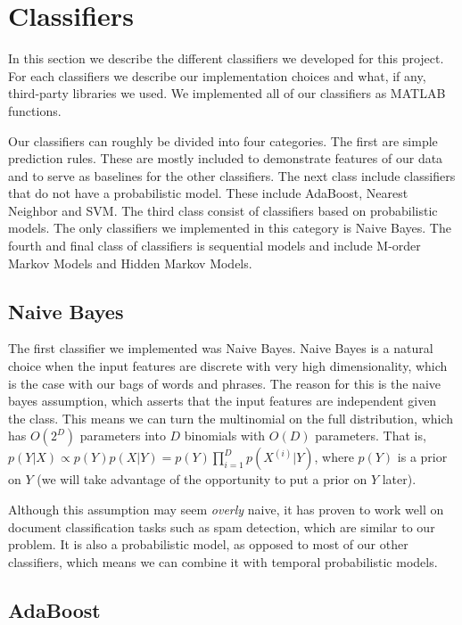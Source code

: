 \documentclass[10pt, twocolumn]{article}
\begin{document}
\section{Classifiers}
\label{sec:techniques}

In this section we describe the different classifiers we developed for this project.
For each classifiers we describe our implementation choices and what, if any, third-party libraries we used.
We implemented all of our classifiers as MATLAB functions.

Our classifiers can roughly be divided into four categories. The first are simple prediction rules. These are mostly included to demonstrate features of our data and to serve as baselines for the other classifiers. The next class include classifiers that do not have a probabilistic model. These include AdaBoost, Nearest Neighbor and SVM. The third class consist of classifiers based on probabilistic models. The only classifiers we implemented in this category is Naive Bayes. The fourth and final class of classifiers is sequential models and include M-order Markov Models and Hidden Markov Models.

\subsection{Naive Bayes}
\label{sec:naive-bayes}

The first classifier we implemented was Naive Bayes.
Naive Bayes is a natural choice when the input features are discrete with very high dimensionality, which is the case with our bags of words and phrases.
The reason for this is the naive bayes assumption, which asserts that the input features are independent given the class.
This means we can turn the multinomial on the full distribution, which has $O(2^D)$ parameters into $D$ binomials with $O(D)$ parameters.
That is, $p(Y|X) \propto p(Y)p(X|Y) = p(Y)\prod_{i=1}^{D}{p(X^{(i)}|Y)}$, where $p(Y)$ is a prior on $Y$ (we will take advantage of the opportunity to put a prior on $Y$ later).

Although this assumption may seem \emph{overly} naive, it has proven to work well on document classification tasks such as spam detection, which are similar to our problem.
It is also a probabilistic model, as opposed to most of our other classifiers, which means we can combine it with temporal probabilistic models.

\subsection{AdaBoost}
\label{sec:adaboost}
\end{document}
